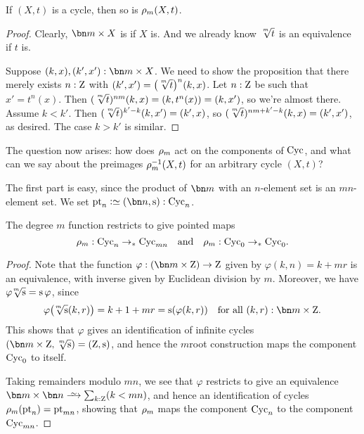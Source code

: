 \begin{lemma}
  If $(X,t)$ is a cycle, then so is $\rho_{m}(X,t)$.
\end{lemma}
\begin{proof}
  Clearly, $\bn m\times X$ is \nonempty if $X$ is.
  And we already know $\sqrt[\uproot{2}m]{t}$ is an equivalence if $t$ is.

  Suppose $(k,x),(k',x'):\bn m\times X$.
  We need to show the proposition that there merely exists $n:\mathrm{Z}$
  with $(k',x') = \bigl(\sqrt[\uproot{2}m]t\bigr)^n(k,x)$.
  Let $n:\mathrm{Z}$ be such that $x' = t^n(x)$.
  Then $(\sqrt[\uproot{2}m]t)^{nm}(k,x) = (k,t^n(x)) = (k,x')$,
  so we're almost there.
  Assume $k<k'$. Then $(\sqrt[\uproot{2}m]t)^{k'-k}(k,x') = (k',x)$,
  so $(\sqrt[\uproot{2}m]t)^{nm+k'-k}(k,x) = (k',x')$, as desired.
  The case $k>k'$ is similar.
\end{proof}

The question now arises: how does $\rho_{m}$ act on the components of $\mathrm{Cyc}$,
and what can we say about the preimages $\rho_{m}^{-1}(X,t)$
for an arbitrary cycle $(X,t)$?

The first part is easy, since the product of $\bn m$ with an $n$-element set
is an $mn$-element set. We set $\pt_n \defeq (\bn n,\zs) : \Cyc_n$.
\begin{lemma}
  The degree $m$ function restricts to give pointed maps
  \[
    \rho_{m} : \mathrm{Cyc}_n \to_\ast \mathrm{Cyc}_{mn} \quad\text{and}\quad
    \rho_{m} : \mathrm{Cyc}_0 \to_\ast \mathrm{Cyc}_0.
  \]
\end{lemma}
\begin{proof}
  Note
  that the function $\varphi : (\bn m\times \zet) \to \zet$
  given by $\varphi(k,n)=k+mr$ is an equivalence,
  with inverse given by Euclidean division by $m$.
  Moreover, we have ${\varphi\!\sqrt[\uproot{2}m]\zs} = {\zs\varphi}$, since
  \[
    \varphi\bigl(\!\sqrt[\uproot{2}m]\zs(k,r)\bigr)
    = k+1+mr = \zs(\varphi(k,r))
    \quad\text{for all $(k,r):\bn m\times \zet$}.
  \]
  This shows that $\varphi$ gives an identification of infinite cycles
  $(\bn m\times\zet, \sqrt[\uproot{2}m]\zs) = (\zet,\zs)$,
  and hence the $m$\th root construction maps the component $\mathrm{Cyc}_0$ to itself.

  Taking remainders modulo $mn$, we see that $\varphi$ restricts
  to give an equivalence $\bn m \times \bn n \we \sum_{k:\zet}(k<mn)$,
  and hence an identification of cycles $\rho_{m}(\mathrm{pt}_n) = \mathrm{pt}_{mn}$,
  showing that $\rho_{m}$ maps the component $\mathrm{Cyc}_n$ to the component $\mathrm{Cyc}_{mn}$.
\end{proof}

